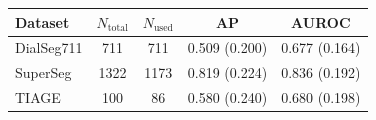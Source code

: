 \begin{tabular}{lcccc}
\toprule
Dataset & $N_\text{total}$ & $N_\text{used}$ & AP & AUROC \\
\midrule
DialSeg711 & 711 & 711 & 0.509 (0.200) & 0.677 (0.164) \\
SuperSeg & 1322 & 1173 & 0.819 (0.224) & 0.836 (0.192) \\
TIAGE & 100 & 86 & 0.580 (0.240) & 0.680 (0.198) \\
\bottomrule
\end{tabular}
